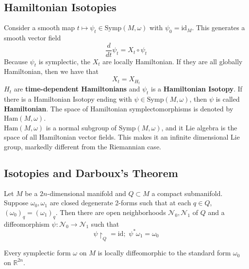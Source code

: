 \subsection{Hamiltonian Isotopies}
\indent Consider a smooth map $t \mapsto \psi_t \in \mathrm{Symp}(M,\omega)$ with $\psi_0=\mathrm{id}_M$. This generates a smooth vector field
\begin{equation}
    \frac{d}{dt}\psi_t = X_t \circ \psi_t
\end{equation}
\indent Because $\psi_t$ is symplectic, the $X_t$ are locally Hamiltonian. If they are all globally Hamiltonian, then we have that
\begin{equation}
    X_t = X_{H_t}
\end{equation}
\indent $H_t$ are \textbf{time-dependent Hamiltonians} and $\psi_t$ is a \textbf{Hamiltonian Isotopy}. If there is a Hamiltonian Isotopy ending with $\psi \in \mathrm{Symp}(M,\omega)$, then $\psi$ is called \textbf{Hamiltonian}. The space of Hamiltonian symplectomorphisms is denoted by $\mathrm{Ham}(M,\omega)$.\\
\indent $\mathrm{Ham}(M,\omega)$ is a normal subgroup of $\mathrm{Symp}(M,\omega)$, and it Lie algebra is the space of all Hamiltonian vector fields. This makes it an infinite dimensional Lie group, markedly different from the Riemannian case.\\
\subsection{Isotopies and Darboux's Theorem}

\begin{lem}
Let $M$ be a $2n$-dimensional manifold and $Q \subset M$ a compact submanifold. Suppose $\omega_0, \omega_1$ are closed degenerate 2-forms such that at each $q \in Q$, $(\omega_0)_q = (\omega_1)_q$. Then there are open neighborhoods $\mathcal{N}_0, \mathcal{N}_1$ of $Q$ and a diffeomorphism $\psi: \mathcal{N}_0 \to \mathcal{N}_1$ such that
\begin{equation}
    \psi \restriction_Q = \mathrm{id}; \hspace{4pt} \psi^* \omega_1 = \omega_0
\end{equation}
\end{lem}

\begin{thm}
Every symplectic form $\omega$ on $M$ is locally diffeomorphic to the standard form $\omega_0$ on $\mathbb{R}^{2n}$.
\end{thm}

